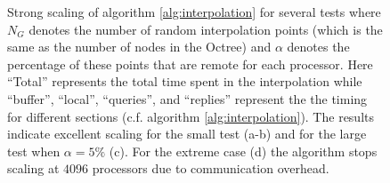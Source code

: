 \begin{figure}[htbp]
\begin{center}
	\end{center}
	\caption{Strong scaling of algorithm \ref{alg:interpolation} for several tests where $N_G$ denotes the number of random interpolation points (which is the same as the number of nodes in the Octree) and $\alpha$ denotes the percentage of these points that are remote for each processor. Here ``Total'' represents the total time spent in the interpolation while ``buffer'', ``local'', ``queries'', and ``replies'' represent the the timing for different sections (c.f. algorithm \ref{alg:interpolation}). The results indicate excellent scaling for the small test (a-b) and for the large test when $\alpha = 5\%$ (c). For the extreme case (d) the algorithm stops scaling at $4096$ processors due to communication overhead.}
	\label{fig:interpolation}
\end{figure}

